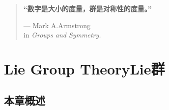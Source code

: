 

\begin{quote}
{\bfseries “数字是大小的度量，群是对称性的度量。”}


\begin{flushright}
--- Mark A.Armstrong\\
in {\itshape Groups and Symmetry.}
\end{flushright}
\end{quote}

\chapter[Lie群]{Lie Group Theory\quad  Lie群}
\label{chap3}

\section*{本章概述}



